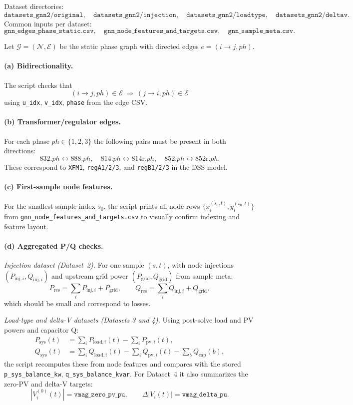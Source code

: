 \documentclass[11pt]{article}
\begin{document}
Dataset directories:
\[
\texttt{datasets\_gnn2/original},\quad
\texttt{datasets\_gnn2/injection},\quad
\texttt{datasets\_gnn2/loadtype},\quad
\texttt{datasets\_gnn2/deltav}.
\]
Common inputs per dataset:
\[
\texttt{gnn\_edges\_phase\_static.csv},\quad
\texttt{gnn\_node\_features\_and\_targets.csv},\quad
\texttt{gnn\_sample\_meta.csv}.
\]

Let $\mathcal{G}=(\mathcal{N},\mathcal{E})$ be the static phase graph with
directed edges $e=(i\to j,ph)$.

\paragraph{(a) Bidirectionality.}
The script checks that
\[
(i\to j,ph)\in\mathcal{E}\ \Longrightarrow\ (j\to i,ph)\in\mathcal{E}
\]
using \texttt{u\_idx}, \texttt{v\_idx}, \texttt{phase} from the edge CSV.

\paragraph{(b) Transformer/regulator edges.}
For each phase $ph\in\{1,2,3\}$ the following pairs must be present in both
directions:
\[
832.ph \leftrightarrow 888.ph,\quad
814.ph \leftrightarrow 814\mathrm{r}.ph,\quad
852.ph \leftrightarrow 852\mathrm{r}.ph.
\]
These correspond to \texttt{XFM1}, \texttt{regA1/2/3}, and
\texttt{regB1/2/3} in the DSS model.

\paragraph{(c) First-sample node features.}
For the smallest sample index $s_0$, the script prints all node rows
$\{x_i^{(s_0,t)},y_i^{(s_0,t)}\}$ from
\texttt{gnn\_node\_features\_and\_targets.csv} to visually confirm indexing and
feature layout.

\paragraph{(d) Aggregated P/Q checks.}
\emph{Injection dataset (Dataset~2).}
For one sample $(s,t)$, with node injections
$(P_{\mathrm{inj},i},Q_{\mathrm{inj},i})$ and upstream grid power
$(P_{\mathrm{grid}},Q_{\mathrm{grid}})$ from sample meta:
\[
P_{\mathrm{res}}=\sum_i P_{\mathrm{inj},i}+P_{\mathrm{grid}},\qquad
Q_{\mathrm{res}}=\sum_i Q_{\mathrm{inj},i}+Q_{\mathrm{grid}},
\]
which should be small and correspond to losses.

\emph{Load-type and delta-V datasets (Datasets 3 and 4).}
Using post-solve load and PV powers and capacitor Q:
\begin{align*}
P_{\mathrm{sys}}(t)
  &=\sum_i P_{\mathrm{load},i}(t)-\sum_i P_{\mathrm{pv},i}(t),\\
Q_{\mathrm{sys}}(t)
  &=\sum_i Q_{\mathrm{load},i}(t)-\sum_i Q_{\mathrm{pv},i}(t)
    -\sum_b Q_{\mathrm{cap}}(b),
\end{align*}
the script recomputes these from node features and compares with the stored
\texttt{p\_sys\_balance\_kw}, \texttt{q\_sys\_balance\_kvar}. For Dataset~4 it
also summarizes the zero-PV and delta-V targets:
\[
|V_i^{(0)}(t)|=\texttt{vmag\_zero\_pv\_pu},\qquad
\Delta|V_i(t)|=\texttt{vmag\_delta\_pu}.
\]
\end{document}
